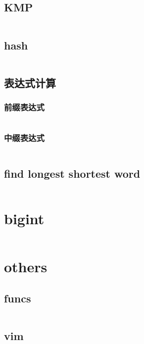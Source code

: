 \documentclass[a4paper,11pt]{article}
\begin{document}
\subsection{KMP}
\inputminted[breaklines]{c++}{string/kmp.cpp}
\subsection{hash}
\inputminted[breaklines]{c++}{string/hash.cpp}
\subsection{表达式计算}
\subsubsection{前缀表达式}
\inputminted[breaklines]{c++}{string/pre_expr.cpp}

\subsubsection{中缀表达式}
\inputminted[breaklines]{c++}{string/post_expr.cpp}
\subsection{find longest shortest word}
\inputminted[breaklines]{c++}{string/find_longest_shortest_word.cpp}

\section{bigint}
\inputminted[breaklines]{c++}{bigint/bigint.cpp}

\section{others}
\subsection{funcs}
\inputminted[breaklines]{c++}{others/funcs.cpp}
\subsection{vim}
\inputminted[breaklines]{c++}{others/vim.txt}
\end{document}
